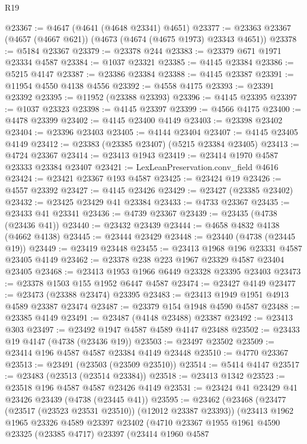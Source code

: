 \begin{lexlean}{R19}
\begin{coremodule}
@23367 := @4647 (@4641 (@4648 @23341) @4651)
@23377 := @23363 @23367 (@4657 (@4667 @621)) (@4673 (@4674 (@4675 @1973) @23343 @4651))
@23378 := @5184 @23367
@23379 := @23378 @244
@23383 := @23379 @671 @1971 @23334 @4587
@23384 := @1037 @23321
@23385 := @4145 @23384
@23386 := @5215 @4147
@23387 := @23386 @23384
@23388 := @4145 @23387
@23391 := @11954 @4550 @4138 @4556
@23392 := @4558 @4175
@23393 := @23391 @23392
@23395 := @11952 (@23388 @23393)
@23396 := @4145 @23395
@23397 := @1037 @23323
@23398 := @4145 @23397
@23399 := @4566 @4175
@23400 := @4478 @23399
@23402 := @4145 @23400 @4149
@23403 := @23398 @23402
@23404 := @23396 @23403
@23405 := @4144 @23404
@23407 := @4145 @23405 @4149
@23412 := @23383 (@23385 @23407) (@5215 @23384 @23405)
@23413 := @4724 @23367
@23414 := @23413 @1943
@23419 := @23414 @1970 @4587 @23333 @23384 @23407
@23421 := LexLeanPreservation.conv_field @4616
@23424 := @23421 @23367 @193 @4587
@23425 := @23424 @19
@23426 := @4557 @23392
@23427 := @4145 @23426
@23429 := @23427 (@23385 @23402)
@23432 := @23425 @23429 @41 @23384
@23433 := @4733 @23367
@23435 := @23433 @41 @23341
@23436 := @4739 @23367
@23439 := @23435 (@4738 (@23436 @41))
@23440 := @23432 @23439
@23444 := @4658 @4832 @4138 (@4662 @4138)
@23445 := @23444 @23429
@23448 := @23440 (@4738 (@23445 @19))
@23449 := @23419 @23448
@23455 := @23413 @1968 @196 @23331 @4587 @23405 @4149
@23462 := @23378 @238 @223 @1967 @23329 @4587 @23404 @23405
@23468 := @23413 @1953 @1966 @6449 @23328 @23395 @23403
@23473 := @23378 @1503 @155 @1952 @6447 @4587
@23474 := @23427 @4149
@23477 := @23473 (@23388 @23474) @23395
@23483 := @23413 @1949 @1951 @4913 @4589 @23387 @23474
@23487 := @23379 @154 @1948 @4590 @4587
@23488 := @23385 @4149
@23491 := @23487 (@4148 @23488) @23387
@23492 := @23413 @303
@23497 := @23492 @1947 @4587 @4589 @4147 @23488
@23502 := @23433 @19 @4147 (@4738 (@23436 @19))
@23503 := @23497 @23502
@23509 := @23414 @196 @4587 @4587 @23384 @4149 @23448
@23510 := @4770 @23367
@23513 := @23491 (@23503 (@23509 @23510))
@23514 := @5414 @4147
@23517 := @23483 (@23513 (@23514 @23384))
@23518 := @23413 @1342
@23523 := @23518 @196 @4587 @4587 @23426 @4149
@23531 := @23424 @41 @23429 @41 @23426 @23439 (@4738 (@23445 @41))
@23595 := @23462
    (@23468
      (@23477 (@23517 (@23523 @23531 @23510)) (@12012 @23387 @23393))
      (@23413
        @1962
        @1965
        @23326
        @4589
        @23397
        @23402
        (@4710
          @23367
          @1955
          @1961
          @4590
          @23325
          (@23385 @4717)
          @23397
          (@23414
            @1960
            @4587

\end{coremodule}
\end{lexlean}
